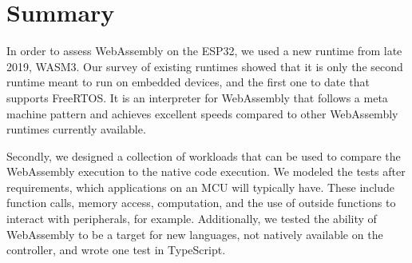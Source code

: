 

\section{Summary}

In order to assess WebAssembly on the ESP32, we used a new runtime from late 2019, WASM3. Our survey of existing runtimes showed that it is only the second runtime meant to run on embedded devices, and the first one to date that supports FreeRTOS. It is an interpreter for WebAssembly that follows a meta machine pattern and achieves excellent speeds compared to other WebAssembly runtimes currently available.

Secondly, we designed a collection of workloads that can be used to compare the WebAssembly execution to the native code execution. We modeled the tests after requirements, which applications on an MCU will typically have. These include function calls, memory access, computation, and the use of outside functions to interact with peripherals, for example. Additionally, we tested the ability of WebAssembly to be a target for new languages, not natively available on the controller, and wrote one test in TypeScript.